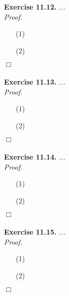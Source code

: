 \documentclass{article}
\begin{document}



\textbf{Exercise 11.12.}
\emph{...} \\

\emph{Proof.}
\begin{enumerate}
\item[(1)]
\item[(2)]

\end{enumerate}
$\Box$ \\\\






\textbf{Exercise 11.13.}
\emph{...} \\

\emph{Proof.}
\begin{enumerate}
\item[(1)]
\item[(2)]

\end{enumerate}
$\Box$ \\\\






\textbf{Exercise 11.14.}
\emph{...} \\

\emph{Proof.}
\begin{enumerate}
\item[(1)]
\item[(2)]

\end{enumerate}
$\Box$ \\\\






\textbf{Exercise 11.15.}
\emph{...} \\

\emph{Proof.}
\begin{enumerate}
\item[(1)]
\item[(2)]

\end{enumerate}
$\Box$ \\\\
\end{document}
